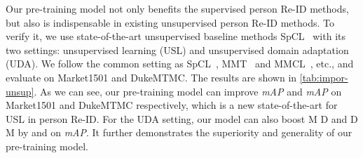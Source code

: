 \documentclass[final]{cvpr}
\begin{document}
Our pre-training model not only benefits the supervised person Re-ID methods, but also is indispensable in existing unsupervised person Re-ID methods. To verify it, we use state-of-the-art unsupervised baseline methods SpCL~\cite{ge2020selfpaced} with its two settings: unsupervised learning (USL) and unsupervised domain adaptation (UDA). We follow the common setting as SpCL~\cite{ge2020selfpaced}, MMT~\cite{ge2019mutual} and MMCL~\cite{wang2020unsupervised}, etc., and evaluate on Market1501 and DukeMTMC. The results are shown in \ref{tab:impor-unsup}. As we can see, our pre-training model can improve  \emph{mAP} and  \emph{mAP} on Market1501 and DukeMTMC respectively, which is a new state-of-the-art for USL in person Re-ID. For the UDA setting, our model can also boost M  D and D  M by  and  on \emph{mAP}. It further demonstrates the superiority and generality of our pre-training model.

\vspace{-1mm}
\end{document}
